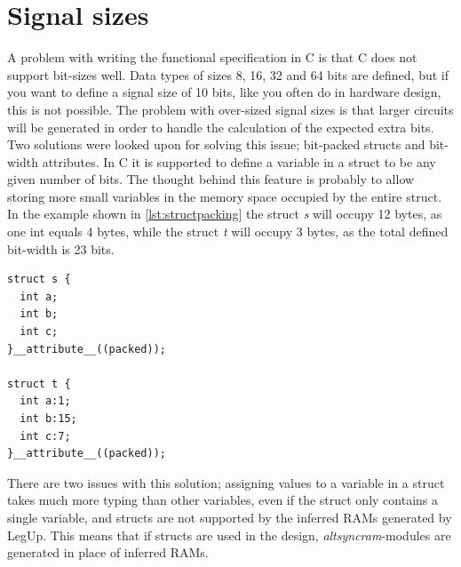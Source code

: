 \section{Signal sizes}
A problem with writing the functional specification in C is that C does not support bit-sizes well. Data types of sizes 8, 16, 32 and 64 bits are defined, but if you want to define a signal size of 10 bits, like you often do in hardware design, this is not possible. The problem with over-sized signal sizes is that larger circuits will be generated in order to handle the calculation of the expected extra bits. Two solutions were looked upon for solving this issue; bit-packed structs and bit-width attributes. In C it is supported to define a variable in a struct to be any given number of bits. The thought behind this feature is probably to allow storing more small variables in the memory space occupied by the entire struct. In the example shown in \cref{lst:structpacking} the struct \textit{s} will occupy 12 bytes, as one int equals 4 bytes, while the struct \textit{t} will occupy 3 bytes, as the total defined bit-width is 23 bits.
\begin{lstlisting}[caption={Struct bit-packing example},label=lst:structpacking]
struct s {
  int a;
  int b;
  int c;
}__attribute__((packed));

struct t {
  int a:1;
  int b:15;
  int c:7;
}__attribute__((packed));
\end{lstlisting}
There are two issues with this solution; assigning values to a variable in a struct takes much more typing than other variables, even if the struct only contains a single variable, and structs are not supported by the inferred RAMs generated by LegUp. This means that if structs are used in the design, \textit{altsyncram}-modules are generated in place of inferred RAMs.

